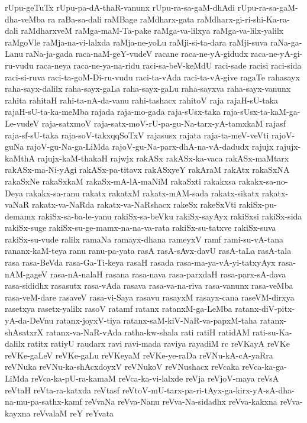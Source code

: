 {rUpu-geTuTx
rUpu-pa-dA-thaR-vanunx
rUpu-ra-sa-gaM-dhAdi
rUpu-ra-sa-gaM-dha-veMba
ra
raBa-sa-dali
raMBage
raMdharx-gata
raMdharx-gi-ri-shi-Ka-ra-dali
raMdharxveM
raMga-maM-Ta-pake
raMga-va-lilxya
raMga-va-lilx-yalilx
raMgoVle
raMja-na-vi-lalxda
raMja-ne-yoLu
raMji-si-ta-dara
raMji-suva
raNa-ga-Lanu
raNa-ja-gada
raca-naM-geY-vudeV
racane
raca-ne-yA-gidudx
raca-ne-yA-gi-ru-vudu
raca-neya
raca-ne-ya-na-ridu
raci-sa-beV-keMdU
raci-sade
racisi
raci-sida
raci-si-ruva
raci-ta-goM-Di-ru-vudu
raci-ta-vAda
raci-ta-vA-give
ragaTe
rahasayx
raha-sayx-dalilx
raha-sayx-gaLa
raha-sayx-gaLu
raha-sayxva
raha-sayx-vanunx
rahita
rahitaH
rahi-ta-nA-da-vanu
rahi-tashacx
rahitoV
raja
rajaH-sU-taka
rajaH-sU-ta-ka-meMba
rajada
raja-mo-gada
raja-sUsx-taka
raja-sUsx-ta-kaM-ga-Le-vudeV
raja-satxmoV
raja-satx-moV-rU-pa-gu-Na-tarx-yA-tamxkaM
rajasf
raja-sf-sU-taka
raja-soV-takxqqSoTxV
rajasusx
rajata
raja-ta-meV-veVti
rajoV-guNa
rajoV-gu-Na-ga-LiMda
rajoV-gu-Na-parx-dhA-na-vA-dadudx
rajujx
rajujx-kaMthA
rajujx-kaM-thakaH
rajwjx
rakASx
rakASx-ka-vaca
rakASx-maMtarx
rakASx-ma-Ni-yAgi
rakASx-pa-titavx
rakASxyeY
rakAraM
rakAtx
rakaSxNA
rakaSxNe
rakaSxkaM
rakaSx-mA-lA-maNiM
rakaSxti
rakakxsa
rakakx-sa-no-Deya
rakakx-sa-ranu
rakatx
rakatxM
rakatx-mAM-sada
rakatx-sikatx
rakatx-vaNaR
rakatx-va-NaRda
rakatx-va-NaRshacx
rakeSx
rakeSxVti
rakiSx-pu-demamx
rakiSx-sa-ba-le-yanu
rakiSx-sa-beVku
rakiSx-sayAyx
rakiSxsi
rakiSx-sida
rakiSx-suge
rakiSx-su-ge-mamx-na-na-va-rata
rakiSx-su-tatxve
rakiSx-suva
rakiSx-su-vude
ralilx
ramaNa
ramayx-dhana
rameyxV
ramf
rami-su-vA-tana
rananx-kaM-teya
ranu
ranu-pa-yata
rasA
rasA-sAvx-davU
rasA-taLa
rasA-tala
rasa
rasa-BeVda
rasa-Ga-Ti-keya
rasaH
rasada
rasa-ma-ya-vA-yi-tatxyAyx
rasa-nAM-gageV
rasa-nA-nalaH
rasana
rasa-nava
rasa-parxdaH
rasa-parx-sA-dava
rasa-sididhx
rasasutx
rasa-vAda
rasava
rasa-va-na-riva
rasa-vanunx
rasa-veMba
rasa-veM-dare
rasaveV
rasa-vi-Saya
rasavu
rasayxM
rasayx-cana
raseVM-dirxya
rasetxya
rasetx-yalilx
rasoV
ratamf
ratanx
ratanxM-ga-LeMba
ratanx-diV-pitx-yA-da-DeVnu
ratanx-joyxV-tiya
ratanx-saM-kiV-NaR-va-papxM-taha
ratanx-shAsatxrX
ratanx-va-NaR-vAda
ratha-kw-shala
rati
ratiH
ratidAM
rati-su-Ka-dalilx
ratitx
ratiyU
raudarx
ravi
ravi-mada
raviya
rayadiM
rc
reVKayA
reVKe
reVKe-gaLeV
reVKe-gaLu
reVKeyaM
reVKe-ye-raDa
reVNu-kA-cA-yaRra
reVNuka
reVNu-ka-shAcxdoyxV
reVNukoV
reVNushacx
reVcaka
reVca-ka-ga-LiMda
reVca-ka-pU-ra-kamaM
reVca-ka-vi-lalxde
reVja
reVjoV-maya
reVsA
reVtaH
reVta-ra-katxda
reVtasf
reVtoV-mU-tarx-pa-ri-tAyx-ga-kirx-yA-sA-dha-na-mu-pa-sathx-kamf
reVvaNa
reVva-Nanu
reVva-Na-sidadhx
reVva-kakxna
reVva-kayxna
reVvalaM
reY
reYvata
}
